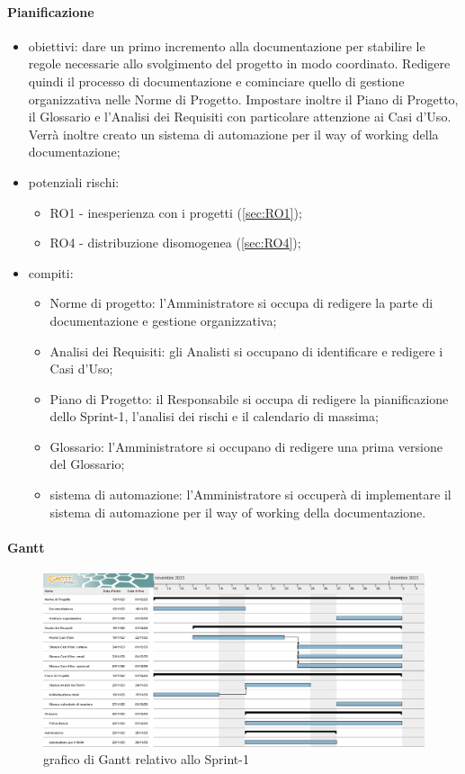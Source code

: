         \paragraph{Pianificazione}
        \begin{itemize}
            \item obiettivi: dare un primo incremento alla documentazione per stabilire le regole necessarie allo svolgimento del progetto in modo coordinato. Redigere quindi il processo di documentazione e cominciare quello di gestione organizzativa nelle Norme di Progetto. Impostare inoltre il Piano di Progetto, il Glossario e l'Analisi dei Requisiti con particolare attenzione ai Casi d'Uso. Verrà inoltre creato un sistema di automazione per il way of working della documentazione;
            \item potenziali rischi: 
            \begin{itemize}
                \item RO1 - inesperienza con i progetti (\ref{sec:RO1});
                \item RO4 - distribuzione disomogenea (\ref{sec:RO4});
            \end{itemize}
            \item compiti:
                \begin{itemize}
                    \item Norme di progetto: l'Amministratore si occupa di redigere la parte di documentazione e gestione organizzativa;
                    \item Analisi dei Requisiti: gli Analisti si occupano di identificare e redigere i Casi d'Uso;
                    \item Piano di Progetto: il Responsabile si occupa di redigere la pianificazione dello Sprint-1, l'analisi dei rischi e il calendario di massima;
                    \item Glossario: l'Amministratore si occupano di redigere una prima versione del Glossario;
                    \item sistema di automazione: l'Amministratore si occuperà di implementare il sistema di automazione per il way of working della documentazione.
                \end{itemize}
        \end{itemize}
        
        \clearpage
        \paragraph{Gantt}
        
        \begin{figure}[H]
            \centering
            \includegraphics[scale=.44]{imgs/sprint1.png}
            \caption{grafico di Gantt relativo allo Sprint-1}
            \label{fig:gantt-sprint1}
        \end{figure}
        \clearpage

